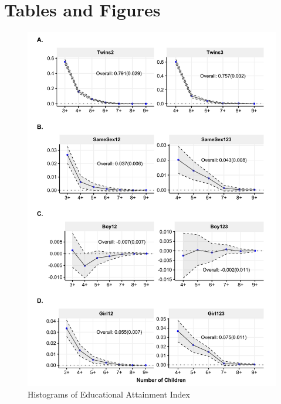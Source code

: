 \documentclass[11pt,a4paper]{article}
\begin{document}
\begin{onehalfspace}



\newpage
\printbibliography

\end{onehalfspace}

\newpage
\section*{Tables and Figures}

\begin{figure}[h!]
\centering
\caption{\label{fig:01}Histograms of Educational Attainment Index}
\includegraphics[width=\textwidth]{figures/acrs.pdf}
\end{figure}
\end{document}
